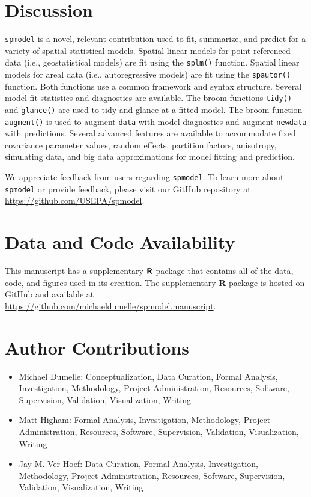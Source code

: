 \documentclass[10pt,letterpaper]{article}
\begin{document}
\hypertarget{sec:discussion}{%
\section{Discussion}\label{sec:discussion}}

\texttt{spmodel} is a novel, relevant contribution used to fit,
summarize, and predict for a variety of spatial statistical models.
Spatial linear models for point-referenced data (i.e., geostatistical
models) are fit using the \texttt{splm()} function. Spatial linear
models for areal data (i.e., autoregressive models) are fit using the
\texttt{spautor()} function. Both functions use a common framework and
syntax structure. Several model-fit statistics and diagnostics are
available. The broom functions \texttt{tidy()} and \texttt{glance()} are
used to tidy and glance at a fitted model. The broom function
\texttt{augment()} is used to augment \texttt{data} with model
diagnostics and augment \texttt{newdata} with predictions. Several
advanced features are available to accommodate fixed covariance
parameter values, random effects, partition factors, anisotropy,
simulating data, and big data approximations for model fitting and
prediction.

We appreciate feedback from users regarding \texttt{spmodel}. To learn
more about \texttt{spmodel} or provide feedback, please visit our GitHub
repository at \url{https://github.com/USEPA/spmodel}.

\hypertarget{data-and-code-availability}{%
\section*{Data and Code Availability}\label{data-and-code-availability}}

This manuscript has a supplementary \(\textbf{\textsf{R}}\) package that
contains all of the data, code, and figures used in its creation. The
supplementary \textbf{\textsf{R}} package is hosted on GitHub and
available at \url{https://github.com/michaeldumelle/spmodel.manuscript}.

\hypertarget{author-contributions}{%
\section*{Author Contributions}\label{author-contributions}}

\begin{itemize}
\item
  Michael Dumelle: Conceptualization, Data Curation, Formal Analysis,
  Investigation, Methodology, Project Administration, Resources,
  Software, Supervision, Validation, Visualization, Writing
\item
  Matt Higham: Formal Analysis, Investigation, Methodology, Project
  Administration, Resources, Software, Supervision, Validation,
  Visualization, Writing
\item
  Jay M. Ver Hoef: Data Curation, Formal Analysis, Investigation,
  Methodology, Project Administration, Resources, Software, Supervision,
  Validation, Visualization, Writing
\end{itemize}
\end{document}
